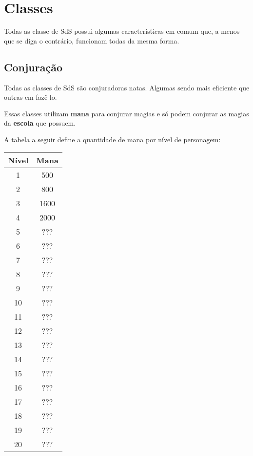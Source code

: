 \chapter{Classes}%
\label{cha:classe}
\begin{multicols}{2}

Todas as classe de SdS possui algumas características em comum que, a menos que
se diga o contrário, funcionam todas da mesma forma.

\section{Conjuração}%

Todas as classes de SdS são conjuradoras natas. Algumas sendo mais eficiente que
outras em fazê-lo.

Essas classes utilizam \textbf{mana} para conjurar magias e só podem conjurar as
magias da \textbf{escola} que possuem.

A tabela a seguir define a quantidade de mana por nível de personagem:

\begin{center}
\begin{tabular}{|||c||c|||}
    \hline
    \textbf{Nível} & \textbf{Mana} \\
    \hline
    \hline
    1 & 500 \\
    \hline
    2 & 800 \\
    \hline
    3 & 1600 \\
    \hline
    4 & 2000 \\
    \hline
    5 & ??? \\
    \hline
    6 & ??? \\
    \hline
    7 & ??? \\
    \hline
    8 & ??? \\
    \hline
    9 & ??? \\
    \hline
    10 & ??? \\
    \hline
    11 & ??? \\
    \hline
    12 & ??? \\
    \hline
    13 & ??? \\
    \hline
    14 & ??? \\
    \hline
    15 & ??? \\
    \hline
    16 & ??? \\
    \hline
    17 & ??? \\
    \hline
    18 & ??? \\
    \hline
    19 & ??? \\
    \hline
    20 & ??? \\
    \hline
\end{tabular}
\end{center}


\end{multicols}
